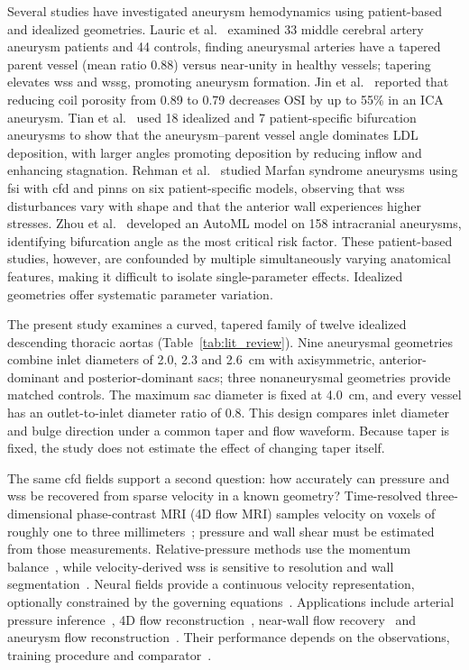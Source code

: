 \documentclass[12pt,a4paper]{article}
\newcommand{\CFD}{\ac{cfd}\xspace}
\newcommand{\FSI}{\ac{fsi}\xspace}
\newcommand{\PINNs}{\acp{pinn}\xspace}
\newcommand{\WSS}{\ac{wss}\xspace}
\newcommand{\WSSG}{\ac{wssg}\xspace}
\newcommand{\OSI}{\ac{OSI}\xspace}
\newcommand{\ICA}{\ac{ICA}\xspace}
\newcommand{\LDL}{\ac{LDL}\xspace}
\theoremstyle{definition}
\numberwithin{equation}{section}
\begin{document}
Several studies have investigated aneurysm hemodynamics using patient-based and idealized geometries. Lauric et al.~\cite{lauric2019proximal} examined 33 middle cerebral artery aneurysm patients and 44 controls, finding aneurysmal arteries have a tapered parent vessel (mean ratio 0.88) versus near-unity in healthy vessels; tapering elevates \WSS and \WSSG, promoting aneurysm formation. Jin et al.~\cite{jin2023cfd} reported that reducing coil porosity from 0.89 to 0.79 decreases \OSI by up to 55\% in an \ICA aneurysm. Tian et al.~\cite{tian2023influence} used 18 idealized and 7 patient-specific bifurcation aneurysms to show that the aneurysm--parent vessel angle dominates \LDL deposition, with larger angles promoting deposition by reducing inflow and enhancing stagnation. Rehman et al.~\cite{ur2025fluid} studied Marfan syndrome aneurysms using \FSI with \CFD and \PINNs on six patient-specific models, observing that \WSS disturbances vary with shape and that the anterior wall experiences higher stresses. Zhou et al.~\cite{zhou2026morphological} developed an AutoML model on 158 intracranial aneurysms, identifying bifurcation angle as the most critical risk factor. These patient-based studies, however, are confounded by multiple simultaneously varying anatomical features, making it difficult to isolate single-parameter effects. Idealized geometries offer systematic parameter variation.

The present study examines a curved, tapered family of twelve idealized descending thoracic aortas (Table~\ref{tab:lit_review}). Nine aneurysmal geometries combine inlet diameters of 2.0, 2.3 and 2.6~cm with axisymmetric, anterior-dominant and posterior-dominant sacs; three nonaneurysmal geometries provide matched controls. The maximum sac diameter is fixed at 4.0~cm, and every vessel has an outlet-to-inlet diameter ratio of 0.8. This design compares inlet diameter and bulge direction under a common taper and flow waveform. Because taper is fixed, the study does not estimate the effect of changing taper itself.

The same \CFD fields support a second question: how accurately can pressure and \WSS be recovered from sparse velocity in a known geometry? Time-resolved three-dimensional phase-contrast MRI (4D flow MRI) samples velocity on voxels of roughly one to three millimeters~\cite{markl2012fourd}; pressure and wall shear must be estimated from those measurements. Relative-pressure methods use the momentum balance~\cite{krittian2012finite,bertoglio2018relative}, while velocity-derived \WSS is sensitive to resolution and wall segmentation~\cite{stalder2008quantitative,petersson2012assessment,potters2015volumetric}. Neural fields provide a continuous velocity representation, optionally constrained by the governing equations~\cite{raissi2019pinn,raissi2020hfm}. Applications include arterial pressure inference~\cite{kissas2020machine}, 4D flow reconstruction~\cite{fathi2020super,saitta2024implicit}, near-wall flow recovery~\cite{arzani2021nearwall} and aneurysm flow reconstruction~\cite{cruzgonzalez2025aaa}. Their performance depends on the observations, training procedure and comparator~\cite{krishnapriyan2021failure,wang2021gradient,mcgreivy2024weak}.
\end{document}
